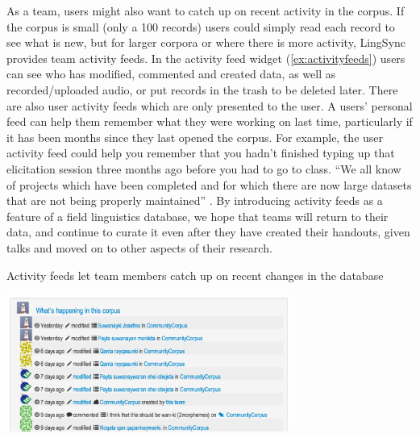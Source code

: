 \documentclass[letterpaper, 12pt, dvips]{mitwpl}
\begin{document}
As a team,
users might also want to catch up on recent activity in the corpus.
If the corpus is small (only a 100 records) users could simply read each record to see what is new,
but for larger corpora or where there is more activity, LingSync provides team activity feeds.
In the activity feed widget (\ref{ex:activityfeeds}) users can see who has modified,
commented and
created data,
as well as recorded/uploaded audio,
or put records in the trash to be deleted later.
There are also user activity feeds which are only presented to the user. %
A users' personal feed  can help them remember what they were working on last time,
particularly if it has been months since they last opened the corpus.
For example,
the user activity feed could help you remember that you hadn't finished typing up that elicitation session three months ago before you had to go to class.
``We all know of projects which have been completed and for which there are now large datasets that are not being properly maintained'' \citep[p.133]{Thieberger:2012}. By introducing activity feeds as a feature of a field linguistics database, we hope that teams will return to their data, and continue to curate it even after they have created their handouts, given talks and moved on to other aspects of their research. 

\begin{exe} 
\ex Activity feeds let team members catch up on recent changes in the database

 \centering
   \includegraphics[width=0.7\textwidth]{activityfeeds} 

\label{ex:activityfeeds}
\end{exe}
\end{document}

